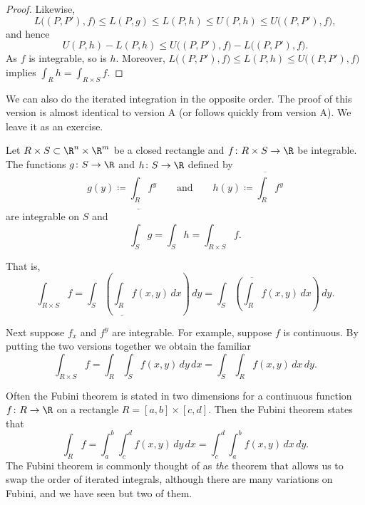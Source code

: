 \begin{proof}
Likewise,
\begin{equation*}
L\bigl((P,P'),f\bigr)
\leq
L(P,g) \leq
L(P,h) \leq
U(P,h) \leq
U\bigl((P,P'),f\bigr) ,
\end{equation*}
and hence
\begin{equation*}
U(P,h) - L(P,h)
\leq
U\bigl((P,P'),f\bigr) -
L\bigl((P,P'),f\bigr) .
\end{equation*}
As $f$ is integrable, so is $h$.
Moreover, $L\bigl((P,P'),f\bigr) \leq L(P,h) \leq U\bigl((P,P'),f\bigr)$
implies
$\int_R h = \int_{R \times S} f$.
\end{proof}

We can also do the iterated integration in the opposite order.
The proof of this version is almost identical to version A
(or follows quickly from version A)\@.
We leave it as an exercise.

\begin{thm}\label{mv:fubinivB}
\pagebreak[2]
Let $R \times S \subset \R^n \times \R^m$ be a closed rectangle and
$f \colon R \times S \to \R$ be integrable.
The functions $g \colon S \to \R$ and $h \colon S \to \R$ defined by
\begin{equation*}
g(y) \coloneqq \underline{\int_R} f^y \qquad
\text{and} \qquad
h(y) \coloneqq \overline{\int_R} f^y 
\end{equation*}
are integrable on $S$ and
\begin{equation*}
\int_S g = \int_S h = \int_{R \times S} f .
\end{equation*}
\end{thm}

That is,
\begin{equation*}
\int_{R \times S} f
=
 \int_S \left(
 \underline{\int_R} f(x,y) \, dx
\right) \, dy
=
 \int_S \left(
 \overline{\int_R} f(x,y) \, dx
\right) \, dy .
\end{equation*}

Next suppose $f_x$ and $f^y$ are integrable.
For example, suppose $f$ is continuous.  By
putting the two versions together we obtain the familiar
\begin{equation*}
\int_{R \times S} f
=
 \int_R 
 \int_S f(x,y) \, dy \, dx 
=
 \int_S 
 \int_R f(x,y) \, dx \, dy .
\end{equation*}

Often the Fubini theorem is stated in two dimensions
for a continuous function $f \colon R \to
\R$ on a rectangle $R = [a,b] \times [c,d]$.  Then the Fubini theorem
states that
\begin{equation*}
\int_R f = \int_a^b \int_c^d f(x,y) \,dy\,dx
=
\int_c^d \int_a^b f(x,y) \,dx\,dy .
\end{equation*}
The Fubini theorem is commonly thought of as \emph{the} theorem that allows us
to swap the order of iterated integrals, although there are many variations
on Fubini, and we have seen but two of them.

